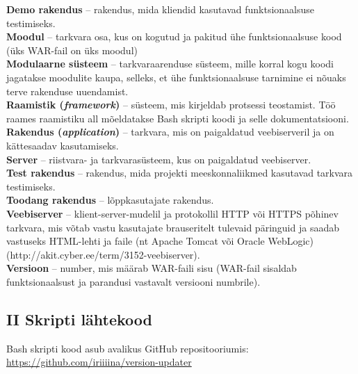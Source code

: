 \documentclass[12pt]{report}
\begin{document}
  \textbf{Demo rakendus} \--- rakendus, mida kliendid kasutavad funktsionaalsuse testimiseks.\\
  
  \textbf{Moodul} \--- tarkvara osa, kus on kogutud ja pakitud ühe funktsionaalsuse kood (üks WAR\--fail on üks moodul)\\
  
  \textbf{Modulaarne süsteem} \--- tarkvaraarenduse süsteem, mille korral kogu koodi jagatakse moodulite kaupa, selleks, et ühe funktsionaalsuse tarnimine ei nõuaks terve rakenduse uuendamist.\\
  
  \textbf{Raamistik (\textit{framework})} \--- süsteem, mis kirjeldab protsessi teostamist. Töö raames raamistiku all mõeldatakse Bash skripti koodi ja selle dokumentatsiooni.\\
  
  \textbf{Rakendus (\textit{application})} \--- tarkvara, mis on paigaldatud veebiserveril ja on kättesaadav kasutamiseks.\\
  
  \textbf{Server} \--- riistvara- ja tarkvarasüsteem, kus on paigaldatud veebiserver.\\
  
  \textbf{Test rakendus} \--- rakendus, mida projekti meeskonnaliikmed kasutavad tarkvara testimiseks.\\
   
  \textbf{Toodang rakendus} \--- lõppkasutajate rakendus.\\
  
  \textbf{Veebiserver} \--- klient-server-mudelil ja protokollil HTTP või HTTPS põhinev tarkvara, mis võtab vastu kasutajate brauseritelt tulevaid päringuid ja saadab vastuseks HTML-lehti ja faile (nt Apache Tomcat või Oracle WebLogic) (http://akit.cyber.ee/term/3152-veebiserver).\\
  
  \textbf{Versioon} \--- number, mis määrab WAR\--faili sisu (WAR\--fail sisaldab funktsionaalsust ja parandusi vastavalt versiooni numbrile).\\
  
  \subsection*{II Skripti lähtekood}
  \label{source-code}
  
  Bash skripti kood asub avalikus GitHub repositooriumis:\\
  \url{https://github.com/iriiiina/version-updater}
  
\end{document}
